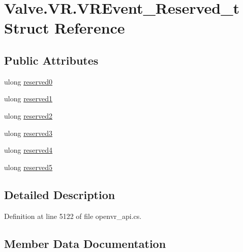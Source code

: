 \hypertarget{struct_valve_1_1_v_r_1_1_v_r_event___reserved__t}{}\section{Valve.\+V\+R.\+V\+R\+Event\+\_\+\+Reserved\+\_\+t Struct Reference}
\label{struct_valve_1_1_v_r_1_1_v_r_event___reserved__t}
\subsection*{Public Attributes}
\begin{DoxyCompactItemize}
\item 
ulong \mbox{\hyperlink{struct_valve_1_1_v_r_1_1_v_r_event___reserved__t_ac8004b13a56b32a3bdec4b65d013125f}{reserved0}}
\item 
ulong \mbox{\hyperlink{struct_valve_1_1_v_r_1_1_v_r_event___reserved__t_af4f9d6b45a9965fd89cbb22670b2add8}{reserved1}}
\item 
ulong \mbox{\hyperlink{struct_valve_1_1_v_r_1_1_v_r_event___reserved__t_afa62e165c432587dbe7cf385bad7d993}{reserved2}}
\item 
ulong \mbox{\hyperlink{struct_valve_1_1_v_r_1_1_v_r_event___reserved__t_aa70e9ac8d78ee3542897571f93910674}{reserved3}}
\item 
ulong \mbox{\hyperlink{struct_valve_1_1_v_r_1_1_v_r_event___reserved__t_af780f533d9285efcc29bde160980dcc3}{reserved4}}
\item 
ulong \mbox{\hyperlink{struct_valve_1_1_v_r_1_1_v_r_event___reserved__t_ae43f8977f4c54906a9284a3411faa32f}{reserved5}}
\end{DoxyCompactItemize}


\subsection{Detailed Description}


Definition at line 5122 of file openvr\+\_\+api.\+cs.



\subsection{Member Data Documentation}
\mbox{\label{struct_valve_1_1_v_r_1_1_v_r_event___reserved__t_ac8004b13a56b32a3bdec4b65d013125f}} 
